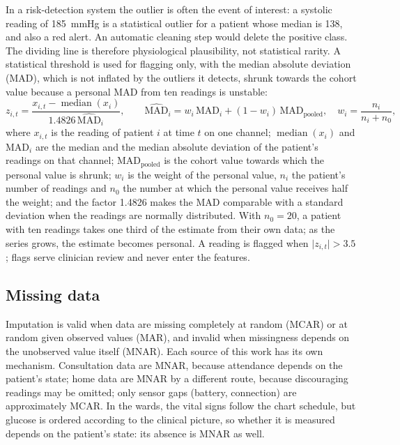 In a risk-detection system the outlier is often the event of interest: a systolic reading of 185~mmHg is a statistical outlier for a patient whose median is 138, and also a red alert. An automatic cleaning step would delete the positive class. The dividing line is therefore physiological plausibility, not statistical rarity. A statistical threshold is used for flagging only, with the median absolute deviation (MAD), which is not inflated by the outliers it detects, shrunk towards the cohort value because a personal MAD from ten readings is unstable:
\begin{equation}
  z_{i,t} = \frac{x_{i,t} - \operatorname{median}(x_i)}{1.4826\,\widehat{\mathrm{MAD}}_i}, \qquad
  \widehat{\mathrm{MAD}}_i = w_i\,\mathrm{MAD}_i + (1-w_i)\,\mathrm{MAD}_{\text{pooled}}, \quad w_i = \frac{n_i}{n_i + n_0},
\end{equation}
where $x_{i,t}$ is the reading of patient $i$ at time $t$ on one channel; $\operatorname{median}(x_i)$ and $\mathrm{MAD}_i$ are the median and the median absolute deviation of the patient's readings on that channel; $\mathrm{MAD}_{\text{pooled}}$ is the cohort value towards which the personal value is shrunk; $w_i$ is the weight of the personal value, $n_i$ the patient's number of readings and $n_0$ the number at which the personal value receives half the weight; and the factor 1.4826 makes the MAD comparable with a standard deviation when the readings are normally distributed. With $n_0 = 20$, a patient with ten readings takes one third of the estimate from their own data; as the series grows, the estimate becomes personal. A reading is flagged when $\lvert z_{i,t}\rvert > 3.5$ \parencite{iglewicz1993}; flags serve clinician review and never enter the features.

\subsection{Missing data}\label{sec:missingness}\label{sec:masking}\label{sec:mask-models}

Imputation is valid when data are missing completely at random (MCAR) or at random given observed values (MAR), and invalid when missingness depends on the unobserved value itself (MNAR). Each source of this work has its own mechanism. Consultation data are MNAR, because attendance depends on the patient's state; home data are MNAR by a different route, because discouraging readings may be omitted; only sensor gaps (battery, connection) are approximately MCAR. In the wards, the vital signs follow the chart schedule, but glucose is ordered according to the clinical picture, so whether it is measured depends on the patient's state: its absence is MNAR as well.

